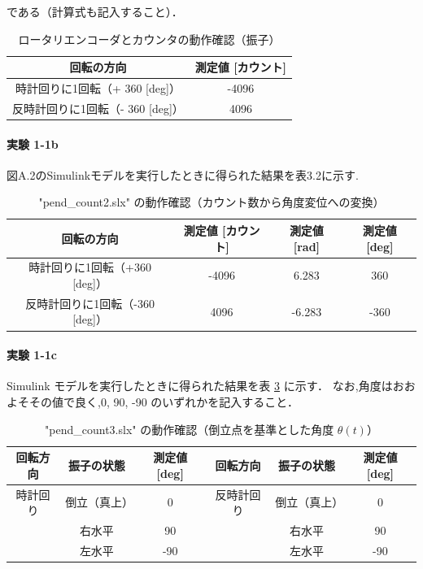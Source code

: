 である（計算式も記入すること）．

\begin{table}[h]
  \centering
  \caption{ロータリエンコーダとカウンタの動作確認（振子）}
  \label{tab:rotation}
  \begin{tabular}{|c|c|}
    \hline
    回転の方向                       & 測定値 [カウント] \\
    \hline
    時計回りに1回転（+ 360 [deg]）   & -4096             \\
    反時計回りに1回転（- 360 [deg]） & 4096              \\
    \hline
  \end{tabular}
\end{table}
\paragraph{実験 1-1b}
図A.2のSimulinkモデルを実行したときに得られた結果を表3.2に示す.

\begin{table}[h]
  \centering
  \caption{"pend\_count2.slx" の動作確認（カウント数から角度変位への変換）}
  \label{tab:pend_count2}
  \begin{tabular}{|c|c|c|c|}
    \hline
    回転の方向                      & 測定値 [カウント] & 測定値 [rad] & 測定値 [deg] \\
    \hline
    時計回りに1回転（+360 [deg]）   & -4096             & 6.283        & 360          \\
    反時計回りに1回転（-360 [deg]） & 4096              & -6.283       & -360         \\
    \hline
  \end{tabular}
\end{table}

\paragraph{実験 1-1c}
Simulink モデルを実行したときに得られた結果を表 \ref{tab:pend_count3} に示す．
なお,角度はおおよそその値で良く,0, 90, -90 のいずれかを記入すること．

\begin{table}[h]
  \centering
  \caption{"pend\_count3.slx" の動作確認（倒立点を基準とした角度 $\theta(t)$）}
  \label{tab:pend_count3}
  \begin{tabular}{|c|c|c|c|c|c|}
    \hline
    回転方向 & 振子の状態   & 測定値 [deg] & 回転方向   & 振子の状態   & 測定値 [deg] \\
    \hline
    時計回り & 倒立（真上） & 0            & 反時計回り & 倒立（真上） & 0            \\
             & 右水平       & 90           &            & 右水平       & 90           \\
             & 左水平       & -90          &            & 左水平       & -90          \\
    \hline
  \end{tabular}
\end{table}


